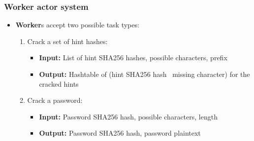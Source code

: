 \documentclass{beamer}
\begin{document}
\begin{frame}
	\frametitle{Worker actor system}

	\begin{figure}[!h]
		\centering
	\end{figure}

	\begin{itemize}

		\item \textbf{Worker}s accept two possible task types:

		\begin{enumerate}

			\item Crack a set of hint hashes:

			\begin{itemize}

				\item \textbf{Input:} List of hint SHA256 hashes, possible characters, prefix

				\item \textbf{Output:} Hashtable of (hint SHA256 hash \textrightarrow \ missing character) for the cracked hints

			\end{itemize}

			\item Crack a password:

			\begin{itemize}

				\item \textbf{Input:} Password SHA256 hash, possible characters, length

				\item \textbf{Output:} Password SHA256 hash, password plaintext

			\end{itemize}

		\end{enumerate}

	\end{itemize}
\end{frame}
\end{document}

